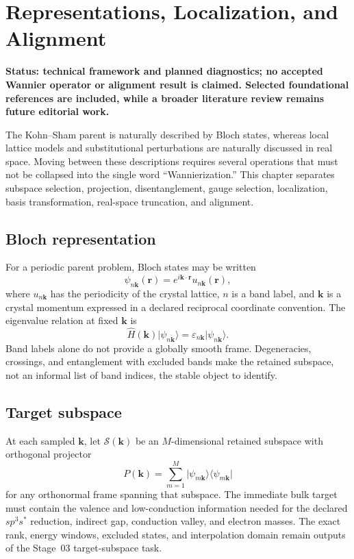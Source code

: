 \chapter{Representations, Localization, and Alignment}
\label{ch:representations-and-alignment}

\textbf{Status: technical framework and planned diagnostics; no accepted Wannier
operator or alignment result is claimed. Selected foundational references are
included, while a broader literature review remains future editorial work.}

The Kohn--Sham parent is naturally described by Bloch states, whereas local
lattice models and substitutional perturbations are naturally discussed in
real space. Moving between these descriptions requires several operations that
must not be collapsed into the single word ``Wannierization.'' This chapter
separates subspace selection, projection, disentanglement, gauge selection,
localization, basis transformation, real-space truncation, and alignment.

\section{Bloch representation}

For a periodic parent problem, Bloch states may be written
\begin{equation}
  \psi_{n\mathbf k}(\mathbf r)
  =
  e^{i\mathbf k\cdot\mathbf r}u_{n\mathbf k}(\mathbf r),
\end{equation}
where $u_{n\mathbf k}$ has the periodicity of the crystal lattice, $n$ is a band
label, and $\mathbf k$ is a crystal momentum expressed in a declared reciprocal
coordinate convention. The eigenvalue relation at fixed $\mathbf k$ is
\begin{equation}
  \widehat H(\mathbf k)
  \lvert\psi_{n\mathbf k}\rangle
  =
  \varepsilon_{n\mathbf k}
  \lvert\psi_{n\mathbf k}\rangle.
\end{equation}
Band labels alone do not provide a globally smooth frame. Degeneracies,
crossings, and entanglement with excluded bands make the retained subspace, not
an informal list of band indices, the stable object to identify.

\section{Target subspace}

At each sampled $\mathbf k$, let $\mathcal S(\mathbf k)$ be an
$M$-dimensional retained subspace with orthogonal projector
\begin{equation}
  P(\mathbf k)
  =
  \sum_{m=1}^{M}
  \lvert\psi_{m\mathbf k}\rangle
  \langle\psi_{m\mathbf k}\rvert
\end{equation}
for any orthonormal frame spanning that subspace. The immediate bulk target must
contain the valence and low-conduction information needed for the declared
$sp^3s^{\ast}$ reduction, indirect gap, conduction valley, and electron masses.
The exact rank, energy windows, excluded states, and interpolation domain remain
outputs of the Stage~03 target-subspace task.

